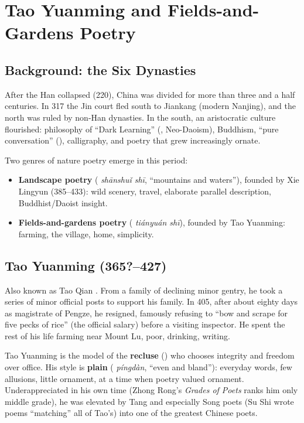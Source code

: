 \chapter{Tao Yuanming and Fields-and-Gardens Poetry}

\section{Background: the Six Dynasties}

After the Han collapsed (220), China was divided for more than three and a half
centuries. In 317 the Jin court fled south to Jiankang (modern Nanjing), and the north was
ruled by non-Han dynasties. In the south, an aristocratic culture flourished: philosophy of
``Dark Learning'' (, Neo-Daoism), Buddhism, ``pure conversation'' (),
calligraphy, and poetry that grew increasingly ornate.

Two genres of nature poetry emerge in this period:
\begin{itemize}
  \item \textbf{Landscape poetry} ( \emph{shānshuǐ shī}, ``mountains and
        waters''), founded by Xie Lingyun  (385--433): wild scenery, travel,
        elaborate parallel description, Buddhist/Daoist insight.
  \item \textbf{Fields-and-gardens poetry} ( \emph{tiányuán shī}), founded by
        Tao Yuanming: farming, the village, home, simplicity.
\end{itemize}

\section{Tao Yuanming  (365?--427)}

Also known as Tao Qian . From a family of declining minor gentry, he took a
series of minor official posts to support his family. In 405, after about eighty days as
magistrate of Pengze, he resigned, famously refusing to ``bow and scrape for five pecks of
rice'' (the official salary) before a visiting inspector. He spent the rest of his life
farming near Mount Lu, poor, drinking, writing.

\begin{important}
Tao Yuanming is the model of the \textbf{recluse} () who chooses integrity
and freedom over office. His style is \textbf{plain} ( \emph{píngdàn}, ``even and
bland''): everyday words, few allusions, little ornament, at a time when poetry valued
ornament. Underappreciated in his own time (Zhong Rong's \emph{Grades of Poets} ranks him
only middle grade), he was elevated by Tang and especially Song poets (Su Shi wrote poems
``matching'' all of Tao's) into one of the greatest Chinese poets.
\end{important}

